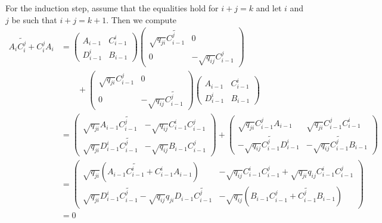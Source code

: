\documentclass [11pt, proquest] {uwthesis}[2020/02/24]
\begin{document}
\begin{prf}
        For the induction step, assume that the equalities hold for $i+j=k$ and let $i$ and $j$ be such that $i+j=k+1$. Then we compute
        \begin{align*}
            A_i\widetilde{C_i^j}+C_i^jA_i&=\begin{pmatrix}
                A_{i-1} & C_{i-1}^i\\ D_{i-1}^i & B_{i-1}
            \end{pmatrix}\begin{pmatrix}
                \sqrt{q_{ji}}\widetilde{C_{i-1}^j} & 0 \\ 0 & -\sqrt{q_{ij}}C_{i-1}^j
            \end{pmatrix}\\
            &\qquad+\begin{pmatrix}
                \sqrt{q_{ji}}C_{i-1}^j & 0 \\ 0 & -\sqrt{q_{ij}}\widetilde{C_{i-1}^j}
            \end{pmatrix}\begin{pmatrix}
                A_{i-1} & C_{i-1}^i\\ D_{i-1}^i & B_{i-1}
            \end{pmatrix}\\
            &=\begin{pmatrix}
                \sqrt{q_{ji}}A_{i-1}\widetilde{C_{i-1}^j} & -\sqrt{q_{ij}}C_{i-1}^iC_{i-1}^j\\
                \sqrt{q_{ji}}D_{i-1}^i\widetilde{C_{i-1}^j} & -\sqrt{q_{ij}}B_{i-1}C_{i-1}^j
            \end{pmatrix}+\begin{pmatrix}
                \sqrt{q_{ji}}C_{i-1}^jA_{i-1} & \sqrt{q_{ji}}C_{i-1}^j C_{i-1}^i\\
                -\sqrt{q_{ij}}\widetilde{C_{i-1}^j}D_{i-1}^i & -\sqrt{q_{ij}}\widetilde{C_{i-1}^j} B_{i-1}
            \end{pmatrix}\\
            &=\begin{pmatrix}
                \sqrt{q_{ji}}(A_{i-1}\widetilde{C_{i-1}^i}+C_{i-1}^iA_{i-1}) & -\sqrt{q_{ij}}C_{i-1}^iC_{i-1}^j+\sqrt{q_{ji}}q_{ij}C_{i-1}^iC_{i-1}^j\\
                \sqrt{q_{ji}}D_{i-1}^i\widetilde{C_{i-1}^j}-\sqrt{q_{ij}}q_{ji}D_{i-1}\widetilde{C_{i-1}^j} & -\sqrt{q_{ij}}(B_{i-1}C_{i-1}^j+\widetilde{C_{i-1}^j}B_{i-1})
            \end{pmatrix}\\
            &=0
        \end{align*}

\end{prf}
\end{document}
